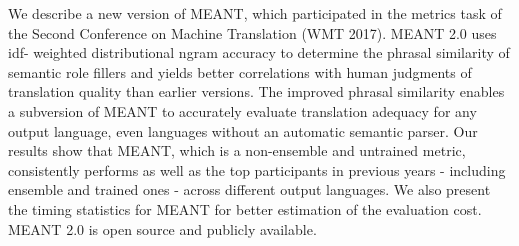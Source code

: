 We describe a new version of MEANT, which participated in the metrics task of the Second Conference on Machine Translation (WMT 2017). MEANT 2.0 uses idf- weighted distributional ngram accuracy to determine the phrasal similarity of semantic role fillers and yields better correlations with human judgments of translation quality than earlier versions. The improved phrasal similarity enables a subversion of MEANT to accurately evaluate translation adequacy for any output language, even languages without an automatic semantic parser. Our results show that MEANT, which is a non-ensemble and untrained metric, consistently performs as well as the top  participants in previous years - including ensemble and trained ones - across different output languages. We also present the timing statistics for MEANT for better estimation of the evaluation cost. MEANT 2.0 is open source and publicly available.

